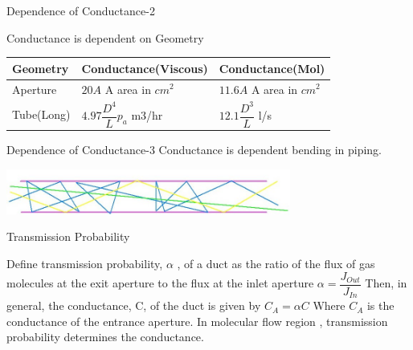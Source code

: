 \documentclass[11]{beamer}
\begin{document}
\begin{frame}{Dependence of Conductance-2}
 
 \begin{block}{Conductance is dependent on Geometry}
 	
 	\begin{center}
 	
 	
 	\begin{tabular}{ | l | l | l | }
    \hline
    Geometry & Conductance(Viscous) & Conductance(Mol)\\ \hline
   
    Aperture
    & $20A $ A area in $cm^2$
    &  $11.6A $ A area in $cm^2$ \\ \hline
	
	
    Tube(Long)
    & $ 4.97 \dfrac{D^4}{L}p_{a} $ m3/hr
    & $ 12.1 \dfrac{D^3}{L} $ l/s \\ \hline 
    
    
    
    
    
    \end{tabular}
\end{center}	
\end{block}
\end{frame}

\begin{frame}{Dependence of Conductance-3}
Conductance is dependent bending in piping.
\begin{center}
\includegraphics[width=0.7\textwidth]{MolFlowPipe.png}
\end{center}
\begin{block}{Transmission Probability}
 	
 	Define transmission probability, $ \alpha$ , of a duct as the ratio of the flux of gas molecules at the exit aperture to the flux at the inlet aperture $ \alpha = \dfrac{J_{Out}}{J_{In}}$  Then, in general, the conductance, C, of the duct is given by $C_A = \alpha C$  Where $C_A $ is the conductance of the entrance aperture. In molecular flow region , transmission probability determines the conductance.
 	
 		

  \end{block}
\end{frame}
\end{document}
